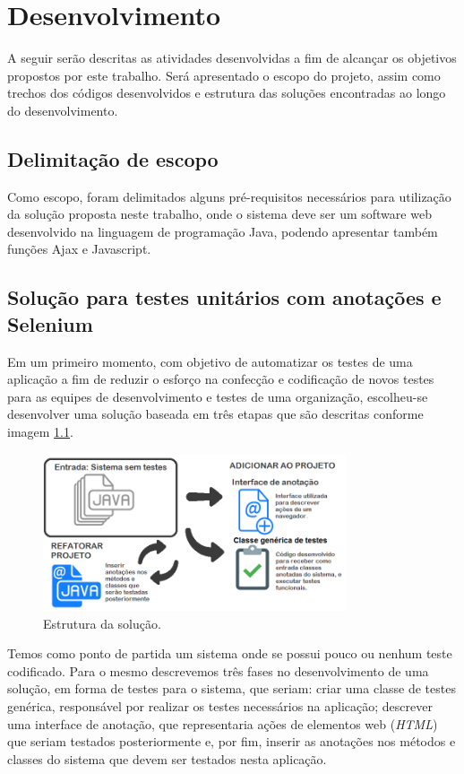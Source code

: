 \documentclass[tg]{mdtufsm}
\begin{document}
\chapter{Desenvolvimento}

A seguir serão descritas as atividades desenvolvidas a fim de alcançar os objetivos propostos por este trabalho. Será apresentado o escopo do projeto, assim como trechos dos códigos desenvolvidos e estrutura das soluções encontradas ao longo do desenvolvimento.

\section{Delimitação de escopo}

Como escopo, foram delimitados alguns pré-requisitos necessários para utilização da solução proposta neste trabalho, onde o sistema deve ser um software web desenvolvido na linguagem de programação Java,
podendo apresentar também funções Ajax e Javascript.

\section{Solução para testes unitários com anotações e Selenium}
Em um primeiro momento, com objetivo de automatizar os testes de uma aplicação a fim de reduzir o esforço na confecção e codificação de novos testes para as equipes de desenvolvimento e testes de uma organização,
escolheu-se desenvolver uma solução baseada em três etapas que são descritas conforme imagem \ref{fig:solucao1}.

\begin{figure}[!htb]
	\centering
	\includegraphics[width=0.8\textwidth]{solucao1}
	\caption{Estrutura da solução.}
	\label{fig:solucao1}
\end{figure}

Temos como ponto de partida um sistema onde se possui pouco ou nenhum teste codificado. Para o mesmo descrevemos  três fases no desenvolvimento de uma solução, em forma de testes para o sistema,
que seriam: criar uma classe de testes genérica, responsável por realizar os testes necessários na aplicação; descrever uma interface de anotação, que representaria ações de elementos web (\emph{HTML}) que
seriam testados posteriormente e, por fim, inserir as anotações nos métodos e classes do sistema que devem ser testados nesta aplicação.
\end{document}
